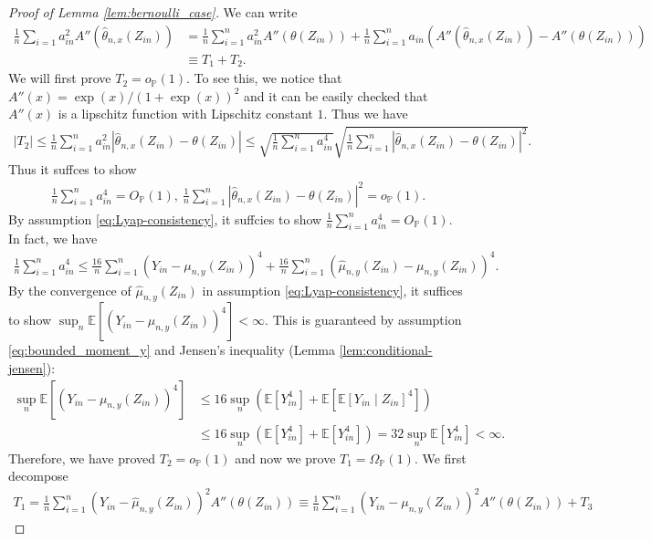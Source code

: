 \documentclass[12pt]{article}
\theoremstyle{definition}
\def\P{\mathbb{P}}
\def\P{\mathbb{P}}
\newcommand{\E}{\mathbb E}								%
\renewcommand{\P}{\mathbb{P}}							%
\newcommand{\srz}{Z}									%
\newcommand{\sry}{Y}									%
\begin{document}
\begin{proof}[Proof of Lemma \ref{lem:bernoulli_case}]
	We can write 
	\begin{align*}
		\frac{1}{n}\sum_{i=1}a_{in}^2A''(\widehat \theta_{n,x}(\srz_{in}))
		&
		=\frac{1}{n}\sum_{i=1}^n a_{in}^2A''(\theta(\srz_{in}))+\frac{1}{n}\sum_{i=1}^n a_{in}(A''(\widehat \theta_{n,x}(\srz_{in}))-A''(\theta(\srz_{in})))\\
		&
		\equiv T_1+T_2.
	\end{align*}
	We will first prove $T_2=o_{\P}(1)$. To see this, we notice that $A''(x)=\exp(x)/ (1+\exp(x))^2$ and it can be easily checked that $A''(x)$ is a lipschitz function with Lipschitz constant $1$. Thus we have
	\begin{align*}
		|T_2|\leq \frac{1}{n}\sum_{i=1}^n a_{in}^2|\widehat \theta_{n,x}(\srz_{in})-\theta(\srz_{in})|\leq \sqrt{\frac{1}{n}\sum_{i=1}^n a_{in}^4}\sqrt{\frac{1}{n}\sum_{i=1}^n |\widehat \theta_{n,x}(\srz_{in})-\theta(\srz_{in})|^2}.
	\end{align*}
	Thus it suffces to show 
	\begin{align}
		\frac{1}{n}\sum_{i=1}^n a_{in}^4=O_{\P}(1),\ \frac{1}{n}\sum_{i=1}^n |\widehat \theta_{n,x}(\srz_{in})-\theta(\srz_{in})|^2=o_{\P}(1).\label{eq:fourth_moment_a}
	\end{align}
	By assumption \eqref{eq:Lyap-consistency}, it suffcies to show $\frac{1}{n}\sum_{i=1}^n a_{in}^4=O_{\P}(1)$. In fact, we have
	\begin{align*}
		\frac{1}{n}\sum_{i=1}^n a_{in}^4\leq \frac{16}{n}\sum_{i=1}^n (\sry_{in}-\mu_{n,y}(\srz_{in}))^4+\frac{16}{n}\sum_{i=1}^n (\widehat{\mu}_{n,y}(\srz_{in})-\mu_{n,y}(\srz_{in}))^4.
	\end{align*}
	By the convergence of $\widehat{\mu}_{n,y}(\srz_{in})$ in assumption \eqref{eq:Lyap-consistency}, it suffices to show $\sup_n\E[(\sry_{in}-\mu_{n,y}(\srz_{in}))^4]<\infty$. This is guaranteed by assumption \eqref{eq:bounded_moment_y} and Jensen's inequality (Lemma \ref{lem:conditional-jensen}):
	\begin{align*}
		\sup_n\E[(\sry_{in}-\mu_{n,y}(\srz_{in}))^4]
		&
		\leq 16\sup_n(\E[\sry_{in}^4]+\E[\E[\sry_{in}\mid\srz_{in}]^4])\\
		&
		\leq  16\sup_n(\E[\sry_{in}^4]+\E[\sry_{in}^4])=32\sup_n\E[\sry_{in}^4]<\infty.
	\end{align*}
	Therefore, we have proved $T_2=o_{\P}(1)$ and now we prove $T_1=\Omega_{\P}(1)$. We first decompose 
	\begin{align*}
		T_1=\frac{1}{n}\sum_{i=1}^n (\sry_{in}-\widehat{\mu}_{n,y}(\srz_{in}))^2A''(\theta(\srz_{in}))\equiv\frac{1}{n}\sum_{i=1}^n (\sry_{in}-\mu_{n,y}(\srz_{in}))^2A''(\theta(\srz_{in}))+T_3

\end{align*}
\end{proof}
\end{document}
